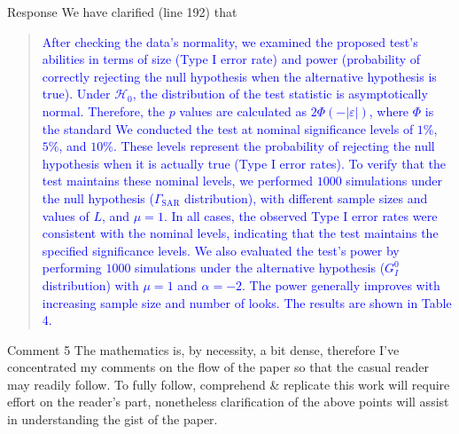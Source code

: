 \documentclass[11pt]{report}
\begin{document}
\begin{responsebox}{Response}
We have clarified (line 192) that
\begin{quote}
	\textcolor{blue}{
		After checking the data's normality, we examined the proposed test's abilities in terms of size (Type I error rate) and power (probability of correctly rejecting the null hypothesis when the alternative hypothesis is true).
Under \(\mathcal{H}_0\), the distribution of the test statistic is asymptotically normal.
Therefore, the \(p\) values are calculated as
\(2\Phi(-|\varepsilon|)\), where \(\Phi\) is the standard
We conducted the test at nominal significance levels of $1\%$, $5\%$, and $10\%$. 
These levels represent the probability of rejecting the null hypothesis when it is actually true (Type I error rates). 
To verify that the test maintains these nominal levels, we performed $1000$ simulations under the null hypothesis ($\Gamma_{\text{SAR}}$ distribution), with different sample sizes and values of $L$, and $\mu=1$. In all cases, the observed Type I error rates were consistent with the nominal levels, indicating that the test maintains the specified significance levels.
We also evaluated the test's power by performing $1000$ simulations under the alternative hypothesis ($G_I^0$ distribution) with $\mu=1$ and $\alpha=-2$.
The power generally improves with increasing sample size and number of looks.
The results are shown in Table 4.
}
\end{quote}

\end{responsebox}

\begin{reviewbox}{Comment 5}
The mathematics is, by necessity, a bit dense, therefore I've concentrated my comments on the flow of the paper so that the casual reader may readily follow. To fully follow, comprehend \& replicate this work will require effort on the reader's part, nonetheless clarification of the above points will assist in understanding the gist of the paper. 
\end{reviewbox}



\end{document}
